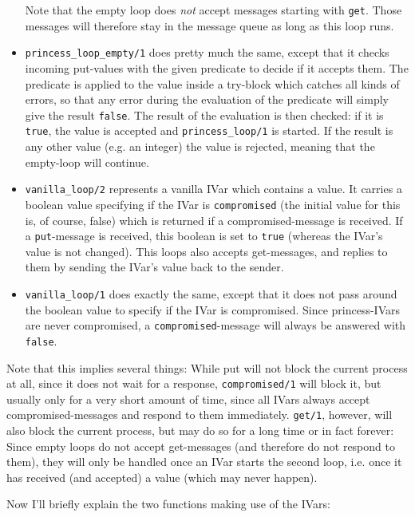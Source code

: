 \documentclass[a4paper]{article}
\begin{document}
\begin{itemize}
  Note that the empty loop does \emph{not} accept messages starting with \texttt{get}. Those messages will therefore stay in the message queue as long as this loop runs.
  \item \texttt{princess\_loop\_empty/1} does pretty much the same, except that it checks incoming put-values with the given predicate to decide if it accepts them. The predicate is applied to the value inside a try-block which catches all kinds of errors, so that any error during the evaluation of the predicate will simply give the result \texttt{false}. The result of the evaluation is then checked: if it is \texttt{true}, the value is accepted and \texttt{princess\_loop/1} is started. If the result is any other value (e.g. an integer) the value is rejected, meaning that the empty-loop will continue.
  \item \texttt{vanilla\_loop/2} represents a vanilla IVar which contains a value. It carries a boolean value specifying if the IVar is \texttt{compromised} (the initial value for this is, of course, false) which is returned if a compromised-message is received. If a \texttt{put}-message is received, this boolean is set to \texttt{true} (whereas the IVar's value is not changed). This loops also accepts get-messages, and replies to them by sending the IVar's value back to the sender.
  \item \texttt{vanilla\_loop/1} does exactly the same, except that it does not pass around the boolean value to specify if the IVar is compromised. Since princess-IVars are never compromised, a \texttt{compromised}-message will always be answered with \texttt{false}.
\end{itemize}

Note that this implies several things: While put will not block the current process at all, since it does not wait for a response, \texttt{compromised/1} will block it, but usually only for a very short amount of time, since all IVars always accept compromised-messages and respond to them immediately. \texttt{get/1}, however, will also block the current process, but may do so for a long time or in fact forever: Since empty loops do not accept get-messages (and therefore do not respond to them), they will only be handled once an IVar starts the second loop, i.e. once it has received (and accepted) a value (which may never happen).

Now I'll briefly explain the two functions making use of the IVars:
\end{document}
